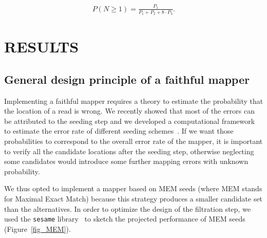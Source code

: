\documentclass[a4,center,fleqn]{NAR}
\begin{document}
\begin{align*}
P(N \geq 1) = \frac{P_1}{P_1 + P_2 + 8\cdot P_3}.
\end{align*}


\section{RESULTS}

\subsection{General design principle of a faithful mapper}

Implementing a faithful mapper requires a theory to estimate the
probability that the location of a read is wrong. We recently showed that
most of the errors can be attributed to the seeding step and we developed
a computational framework to estimate the error rate of different seeding
schemes~\cite{Filion619155}. If we want those probabilities to correspond
to the overall error rate of the mapper, it is important to verify all the
candidate locations after the seeding step, otherwise neglecting some
candidates would introduce some further mapping errors with unknown
probability.

We thus opted to implement a mapper based on MEM seeds (where MEM stands
for Maximal Exact Match) because this strategy produces a smaller
candidate set than the alternatives. In order to optimize the design of
the filtration step, we used the \texttt{sesame}
library~\cite{Filion619155} to sketch the projected performance of MEM
seeds (Figure~\ref{fig_MEM}).
\end{document}
